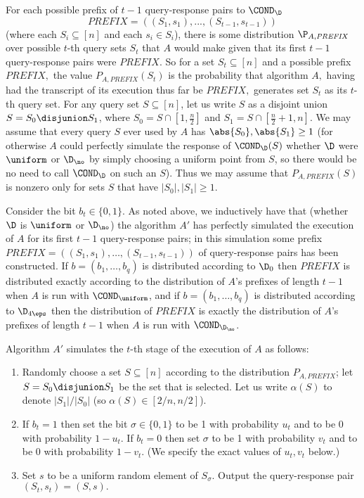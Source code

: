 For each possible prefix of $t-1$ query-response pairs to $\COND_\D$
\[
\mathit{PREFIX} = ((S_1,s_1),...,(S_{t-1},s_{t-1}))
\]
(where each $S_i \subseteq [n]$ and each $s_i \in S_i$),
there is some distribution $\P_{A,\mathit{PREFIX}}$ over possible
$t$-th query sets $S_t$ that $A$ would make given that its first $t-1$
query-response pairs were $\mathit{PREFIX}.$
So for a set $S_t \subseteq [n]$ and a possible prefix
$\mathit{PREFIX},$ the value $P_{A,\mathit{PREFIX}}(S_t)$ is the probability that algorithm $A,$
having had the transcript of its execution thus far be $\mathit{PREFIX},$
generates set $S_t$ as its $t$-th query set.
For any query set {$S \subseteq [n]$}, let us write $S$ as a disjoint union
$S = S_{0} \disjunion S_{1}$, where $S_{0}=S \cap
\left[1,\frac{n}{2}\right]$ and $S_{1}=S \cap [\frac{n}{2}+1,n]$.
We may assume that every query $S$ ever used by $A$ has
$\abs{ S_0 },\abs{ S_1 } \geq 1$ (for otherwise $A$ could perfectly
simulate the response of $\COND_\D(S)$ whether $\D$ were
$\uniform$ or $\D_{\text \no}$ by simply choosing a uniform point
from $S$, so there would be no need to call $\COND_\D$ on such an $S$).
Thus we may assume that $P_{A,\mathit{PREFIX}}(S)$ is nonzero only for sets $S$
that have $|S_0|,|S_1| \geq 1.$

Consider the bit $b_t \in \{0,1\}$. As noted above, we inductively have
that (whether $\D$ is $\uniform$ or $\D_{\text \no}$) the algorithm
$A'$ has perfectly simulated the execution of $A$ for its first
$t-1$ query-response pairs; in this simulation some prefix
$\mathit{PREFIX}=((S_1,s_1),\dots,(S_{t-1},s_{t-1}))$ of query-response
pairs has been constructed.  If $b=(b_1,\dots,b_q)$ is distributed
according to $\D_0$ then $\mathit{PREFIX}$ is distributed exactly according to
the distribution of $A$'s prefixes of length $t-1$ when $A$
is run with $\COND_{\uniform}$, and if $b=(b_1,\dots,b_q)$ is distributed
according to $\D_{4\eps}$ then the distribution of $\mathit{PREFIX}$ is
exactly the distribution of $A$'s prefixes of length $t-1$ when $A$
is run with $\COND_{\D_{\text \no}}$.

\noindent Algorithm $A'$ simulates the $t$-th stage of the execution of $A$
as follows:
\begin{enumerate}
\item Randomly choose a set {$S\subseteq [n]$} according to the
distribution $P_{A,\mathit{PREFIX}}$; let $S=S_0 \disjunion S_1$
be the set that is selected.  Let us write $\alpha(S)$ to denote $|S_1|/|S_0|$ (so $\alpha(S) \in [2/n,n/2]$).

\item If $b_t = 1$ then set the bit $\sigma \in \{0,1\}$ to
be 1 with probability $u_t$ and to be 0 with
probability $1-u_t$. If $b_t= 0$ then set $\sigma$ to be 1
with probability $v_t$ and to be 0 with probability $1-v_t$.
(We specify the exact values of $u_t,v_t$ below.)

\item Set $s$ to be a uniform random element of $S_{\sigma}.$
Output the query-response pair $(S_t,s_t)=(S,s).$

\end{enumerate}

